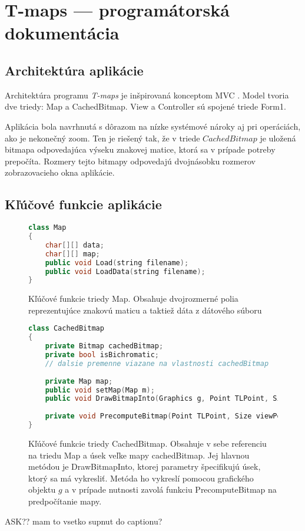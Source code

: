 \chapter{T-maps --- programátorská dokumentácia}
\label{programdoc}

\section{Architektúra aplikácie}
Architektúra programu \emph{T-maps} je inšpirovaná konceptom MVC \cite{krasner_mvc_1988}.
Model tvoria dve triedy: Map a CachedBitmap.
View a Controller sú spojené triede Form1.


Aplikácia bola navrhnutá s dôrazom na nízke systémové nároky aj pri operáciách, ako je nekonečný zoom. 
Ten je riešený tak, že v triede $CachedBitmap$ je uložená bitmapa odpovedajúca výseku znakovej matice, ktorá sa v prípade potreby prepočíta.
Rozmery tejto bitmapy odpovedajú dvojnásobku rozmerov zobrazovacieho okna aplikácie.

\section{Kľúčové funkcie aplikácie}



\begin{figure}[H]
\begin{lstlisting}[language=C++]
class Map
{
    char[][] data;
    char[][] map;
    public void Load(string filename);
    public void LoadData(string filename);
}
\end{lstlisting}
\caption{Kľúčové funkcie triedy Map. Obsahuje dvojrozmerné polia reprezentujúce znakovú maticu a taktiež dáta z dátového súboru}
\label{fig:map_interface}
\end{figure}



\begin{figure}[H]
\begin{lstlisting}[language=C++]
class CachedBitmap
{
	private Bitmap cachedBitmap;
	private bool isBichromatic;
	// dalsie premenne viazane na vlastnosti cachedBitmap
	
    private Map map;
    public void setMap(Map m);
    public void DrawBitmapInto(Graphics g, Point TLPoint, Size ViewPortSize, int squareS, bool isBichrom, bool forcePrecomputing = false);
 
    private void PrecomputeBitmap(Point TLPoint, Size viewPortSize);
}
\end{lstlisting}
\caption{Kľúčové funkcie triedy CachedBitmap. 
Obsahuje v sebe referenciu na triedu Map a úsek veľke mapy cachedBitmap. Jej hlavnou metódou je DrawBitmapInto,
ktorej parametry špecifikujú úsek, ktorý sa má vykresliť. Metóda ho vykreslí pomocou grafického objektu $g$ a v prípade nutnosti zavolá funkciu
PrecomputeBitmap na predpočítanie mapy.}
\label{fig:cachedbitmap_interface_plus}
\end{figure}

ASK?? mam to vsetko supnut do captionu?
